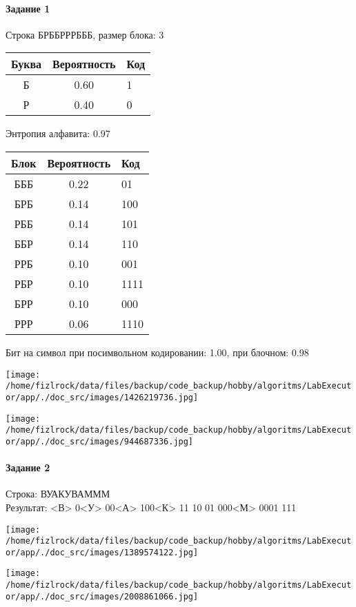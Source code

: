\documentclass[a4paper, 12pt]{article}
\begin{document}
\paragraph{Задание 1}

Строка БРББРРРБББ, размер блока: 3
\begin{center}
 \begin{tabular}{ |c|c|l| } 
  \hline
     Буква & Вероятность & Код\\ \hline
Б & 0.60 & 1\\\hline
Р & 0.40 & 0
\\ \hline \end{tabular}
\end{center}
Энтропия алфавита: 0.97
\begin{center}
 \begin{tabular}{ |c|c|l| } 
  \hline
     Блок & Вероятность & Код\\ \hline
БББ & 0.22 & 01\\\hline
БРБ & 0.14 & 100\\\hline
РББ & 0.14 & 101\\\hline
ББР & 0.14 & 110\\\hline
РРБ & 0.10 & 001\\\hline
РБР & 0.10 & 1111\\\hline
БРР & 0.10 & 000\\\hline
РРР & 0.06 & 1110
\\ \hline \end{tabular}
\end{center}
Бит на символ при посимвольном кодировании: 1.00, при блочном: 0.98

\texttt{[image: /home/fizlrock/data/files/backup/code\_backup/hobby/algoritms/LabExecutor/app/./doc\_src/images/1426219736.jpg]}

\texttt{[image: /home/fizlrock/data/files/backup/code\_backup/hobby/algoritms/LabExecutor/app/./doc\_src/images/944687336.jpg]}
\pagebreak
\paragraph{Задание 2}

Строка: 
ВУАКУВАМММ\\
Результат: <В> 0<У> 00<А> 100<К> 11 10 01 000<М> 0001 111

\texttt{[image: /home/fizlrock/data/files/backup/code\_backup/hobby/algoritms/LabExecutor/app/./doc\_src/images/1389574122.jpg]}

\texttt{[image: /home/fizlrock/data/files/backup/code\_backup/hobby/algoritms/LabExecutor/app/./doc\_src/images/2008861066.jpg]}
\end{document}
